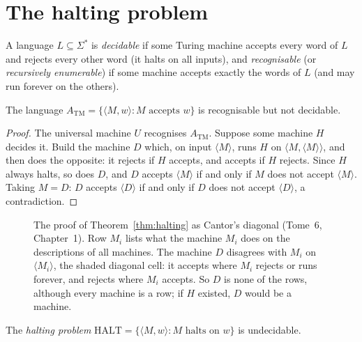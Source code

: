 \section{The halting problem}\label{sec:halting}

\begin{definition}\label{def:decidable}
A language $L\subseteq\Sigma^*$ is \emph{decidable} if some Turing machine accepts every word of $L$ and rejects every other word (it halts on all inputs), and \emph{recognisable} (or \emph{recursively enumerable}) if some machine accepts exactly the words of $L$ (and may run forever on the others).
\end{definition}

\begin{theorem}[Turing, 1936]\label{thm:halting}
The language $A_{\mathrm{TM}}=\{\langle M,w\rangle:M\text{ accepts }w\}$ is recognisable but not decidable.
\end{theorem}

\begin{proof}
The universal machine $U$ recognises $A_{\mathrm{TM}}$. Suppose some machine $H$ decides it. Build the machine $D$ which, on input $\langle M\rangle$, runs $H$ on $\langle M,\langle M\rangle\rangle$, and then does the opposite: it rejects if $H$ accepts, and accepts if $H$ rejects. Since $H$ always halts, so does $D$, and $D$ accepts $\langle M\rangle$ if and only if $M$ does not accept $\langle M\rangle$. Taking $M=D$: $D$ accepts $\langle D\rangle$ if and only if $D$ does not accept $\langle D\rangle$, a contradiction.
\end{proof}

\begin{figure}[ht]
\centering
{}
\caption{The proof of Theorem~\ref{thm:halting} as Cantor's diagonal (Tome~6, Chapter~1). Row $M_i$ lists what the machine $M_i$ does on the descriptions of all machines. The machine $D$ disagrees with $M_i$ on $\langle M_i\rangle$, the shaded diagonal cell: it accepts where $M_i$ rejects or runs forever, and rejects where $M_i$ accepts. So $D$ is none of the rows, although every machine is a row; if $H$ existed, $D$ would be a machine.}
\label{fig:diagonal}
\end{figure}

\begin{corollary}\label{cor:halt}
The \emph{halting problem} $\mathrm{HALT}=\{\langle M,w\rangle:M\text{ halts on }w\}$ is undecidable.
\end{corollary}

